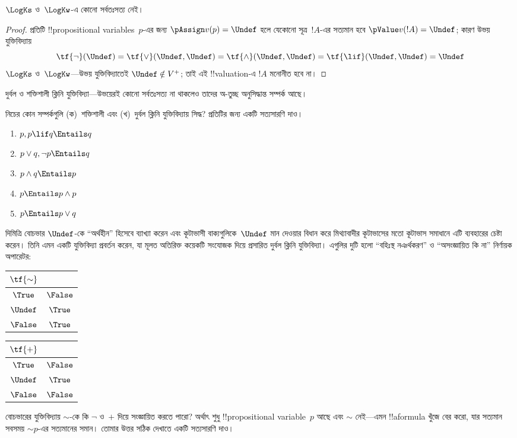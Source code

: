 \documentclass[../../../include/open-logic-section]{subfiles}
\begin{document}
\begin{prop}
  $\LogKs$ ও~$\LogKw$-এ কোনো সর্বতঃসত্য নেই।
\end{prop}

\begin{proof}
  প্রতিটি !!{propositional variable}s~$p$-এর জন্য
  $\pAssign v(p) = \Undef$ হলে যেকোনো সূত্র~$!A$-এর সত্যমান হবে
  $\pValue v(!A) = \Undef$; কারণ উভয় যুক্তিবিদ্যায়
  \[
    \tf{\lnot}(\Undef) = \tf{\lor}(\Undef, \Undef) = \tf{\land}(\Undef,
  \Undef) = \tf{\lif}(\Undef, \Undef) = \Undef
  \]
  $\LogKs$ ও~$\LogKw$—উভয় যুক্তিবিদ্যাতেই $\Undef \notin V^+$; তাই এই
  !!{valuation}-এ $!A$ মনোনীত হবে না।
\end{proof}

দুর্বল ও শক্তিশালী ক্লিনি যুক্তিবিদ্যা—উভয়েরই কোনো সর্বতঃসত্য না থাকলেও
তাদের অ-তুচ্ছ অনুসিদ্ধান্ত সম্পর্ক আছে।

\begin{prob}
  নিচের কোন সম্পর্কগুলি (ক)~শক্তিশালী এবং (খ)~দুর্বল ক্লিনি যুক্তিবিদ্যায়
  সিদ্ধ? প্রতিটির জন্য একটি সত্যসারণি দাও।
  \begin{enumerate}
    \item $p, p \lif q \Entails q$
    \item $p \lor q, \lnot p \Entails q$
    \item $p \land q \Entails p$
    \item $p \Entails p \land p$
    \item $p \Entails p \lor q$
  \end{enumerate}
\end{prob}

দিমিত্রি বোচভার $\Undef$-কে “অর্থহীন” হিসেবে ব্যাখ্যা করেন এবং
কূটাভাসী বাক্যগুলিকে~$\Undef$ মান দেওয়ার বিধান করে মিথ্যাবাদীর
কূটাভাসের মতো কূটাভাস সমাধানে এটি ব্যবহারের চেষ্টা করেন। তিনি এমন একটি
যুক্তিবিদ্যা প্রবর্তন করেন, যা মূলত অতিরিক্ত কয়েকটি সংযোজক দিয়ে প্রসারিত
দুর্বল ক্লিনি যুক্তিবিদ্যা। এগুলির দুটি হলো “বহিঃস্থ নঞর্থকরণ” ও
“অসংজ্ঞায়িত কি না” নির্ণায়ক অপারেটর:
\begin{center}
  \begin{tabular}{c|c}
    $\tf{\sim}$ & \\
    \hline
    $\True$ & $\False$ \\
    $\Undef$ & $\True$ \\
    $\False$ & $\True$
  \end{tabular}
\quad
  \begin{tabular}{c|c}
    $\tf{+}$ & \\
    \hline
    $\True$ & $\False$ \\
    $\Undef$ & $\True$ \\
    $\False$ & $\False$
  \end{tabular}
\end{center}

\begin{prob}
  বোচভারের যুক্তিবিদ্যায় $\sim$-কে কি $\lnot$ ও~$+$ দিয়ে সংজ্ঞায়িত
  করতে পারো? অর্থাৎ শুধু !!{propositional
  variable}~$p$ আছে এবং
  $\sim$ নেই—এমন !!a{formula} খুঁজে বের করো, যার সত্যমান সবসময়
  $\mathord{\sim}p$-এর সত্যমানের সমান। তোমার উত্তর সঠিক দেখাতে একটি
  সত্যসারণি দাও।
\end{prob}
\end{document}

